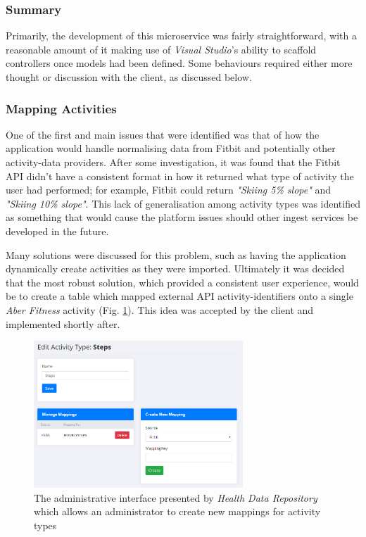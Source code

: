\subsubsection{Summary}
Primarily, the development of this microservice was fairly straightforward, with a reasonable amount of it making use of \textit{Visual Studio}'s ability to scaffold controllers once models had been defined. Some behaviours required either more thought or discussion with the client, as discussed below.

\subsubsection{Mapping Activities}

One of the first and main issues that were identified was that of how the application would handle normalising data from Fitbit and potentially other activity-data providers. After some investigation, it was found that the Fitbit API didn't have a consistent format in how it returned what type of activity the user had performed; for example, Fitbit could return \textit{"Skiing 5\% slope"} and \textit{"Skiing 10\% slope"}. This lack of generalisation among activity types was identified as something that would cause the platform issues should other ingest services be developed in the future. 

Many solutions were discussed for this problem, such as having the application dynamically create activities as they were imported. Ultimately it was decided that the most robust solution, which provided a consistent user experience, would be to create a table which mapped external API activity-identifiers onto a single \textit{Aber Fitness} activity (Fig. \ref{fig:health_mappings}). This idea was accepted by the client and implemented shortly after.

\begin{figure}[H]
    \centering
    \includegraphics[width=0.7\textwidth]{Images/Chpt5_HealthData_Mapping.png}
    \caption{The administrative interface presented by \textit{Health Data Repository} which allows an administrator to create new mappings for activity types}
    \label{fig:health_mappings}
\end{figure}

